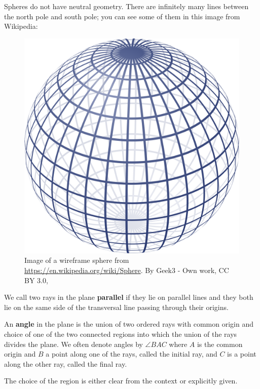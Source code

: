 \documentclass[instructornotes]{ximera}
\begin{document}
\begin{remark}
 Spheres do not have neutral geometry. There are infinitely many lines between the north pole and south pole; you can see some of them in this image from Wikipedia:
 
\begin{figure}[h]
 \includegraphics[width=.5\textwidth]{euclidsPostulatesForPlaneGeometry/Sphere.png}
\caption{Image of a wireframe sphere from \url{https://en.wikipedia.org/wiki/Sphere}. By Geek3 - Own work, CC BY 3.0, %
}
\end{figure}
\end{remark}

\begin{definition}
We call two rays in the plane \textbf{parallel} if they lie on
parallel lines and they both lie on the same side of the transversal
line passing through their origins.
\end{definition}

\begin{definition} An \textbf{angle} in the plane is the union of two ordered
rays with common origin and choice of one of the two connected regions
into which the union of the rays divides the plane. We often denote
angles by $\angle BAC$ where $A$ is the common origin and $B$ a point
along one of the rays, called the initial ray, and $C$ is a point
along the other ray, called the final ray.
\end{definition}


The choice of the region is either clear from the context or
explicitly given.
\end{document}
